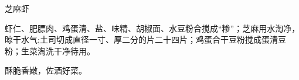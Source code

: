 \begin{recipe}{芝麻虾}

\ingredients



\cooking

\step 虾仁、肥膘肉、鸡蛋清、盐、味精、胡椒面、水豆粉合搅成“糁”；芝麻用水淘净，晾干水气;土司切成直径一寸、厚二分的片二十四片；鸡蛋合干豆粉搅成蛋清豆粉；生菜淘洗干净待用。

\notes

酥脆香嫩，佐酒好菜。

\end{recipe}


